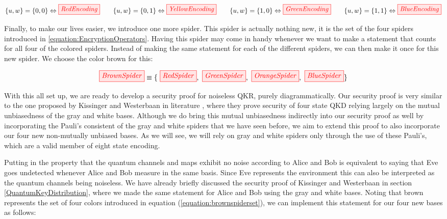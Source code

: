 \documentclass[]{article}
\begin{document}

\begin{equation}
	\label{equation:EncryptionOperators}
	\{u,w\} = \{0, 0\} \Leftrightarrow \tikzfig{RedEncoding} ~~~~~~ \{u,w\} = \{0, 1\} \Leftrightarrow \tikzfig{YellowEncoding}~~~~~~ \{u,w\} = \{1, 0\} \Leftrightarrow \tikzfig{GreenEncoding}~~~~~~ \{u,w\} = \{1, 1\} \Leftrightarrow \tikzfig{BlueEncoding}
\end{equation}

Finally, to make our lives easier, we introduce one more spider. This spider is actually nothing new, it is the set of the four spiders introduced in \ref{equation:EncryptionOperators}. Having this spider may come in handy whenever we want to make a statement that counts for all four of the colored spiders. Instead of making the same statement for each of the different spiders, we can then make it once for this new spider. We choose the color brown for this:

\begin{equation}
\label{equation:brownspiderset}
\tikzfig{BrownSpider} \equiv \{~\tikzfig{RedSpider},~ \tikzfig{GreenSpider},~ \tikzfig{OrangeSpider},~ \tikzfig{BlueSpider}\}
\end{equation}

 With this all set up, we are ready to develop a security proof for noiseless QKR, purely diagrammatically. Our security proof is very similar to the one proposed by Kissinger and Westerbaan in literature \cite{Kissinger2017}, where they prove security of four state QKD relying largely on the mutual unbiasedness of the gray and white bases. Although we do bring this mutual unbiasedness indirectly into our security proof as well by incorporating the Pauli's consistent of the gray and white spiders that we have seen before, we aim to extend this proof to also incorporate our four new non-mutually unbiased bases. As we will see, we will rely on gray and white spiders only through the use of these Pauli's, which are a valid member of eight state encoding.

Putting in the property that the quantum channels and maps exhibit no noise according to Alice and Bob is equivalent to saying that Eve goes undetected whenever Alice and Bob measure in the same basis. Since Eve represents the environment this can also be interpreted as the quantum channels being noiseless. We have already briefly discussed the security proof of Kissinger and Westerbaan in section \ref{QuantumKeyDistribution}, where we made the same statement for Alice and Bob using the gray and white bases. Noting that brown represents the set of four colors introduced in equation (\ref{equation:brownspiderset}), we can implement this statement for our four new bases as follows:
\end{document}
